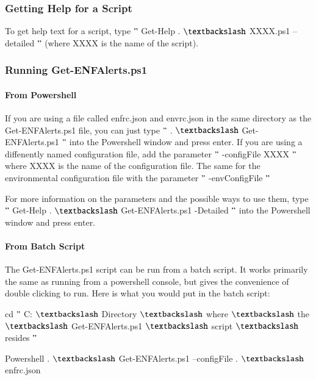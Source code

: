 \documentclass[a4paper,12pt]{report}
\begin{document}
\subsubsection*{Getting Help for a Script}
 \par
To get help text for a script, type  $ " $ Get-Help . $  \textbackslash  $ XXXX.ps1 –detailed $ " $  (where XXXX is the name of the script). \par
\subsubsection*{Running Get-ENFAlerts.ps1}
 \par
\paragraph*{From Powershell}
 \par
If you are using a file called enfrc.json and envrc.json in the same directory as the Get-ENFAlerts.ps1 file, you can just type  $ " $ . $  \textbackslash  $ Get-ENFAlerts.ps1 $ " $  into the Powershell window and press enter. If you are using a diffenently named configuration file, add the parameter  $ " $ -configFile XXXX $ " $  where XXXX is the name of the configuration file. The same for the environmental configuration file with the parameter  $ " $ -envConfigFile $ " $  \par
For more information on the parameters and the possible ways to use them, type  $ " $ Get-Help . $  \textbackslash  $ Get-ENFAlerts.ps1 -Detailed $ " $  into the Powershell window and press enter. \par
\paragraph*{From Batch Script}
 \par
The Get-ENFAlerts.ps1 script can be run from a batch script. It works primarily the same as running from a powershell console, but gives the convenience of double clicking to run. Here is what you would put in the batch script: \par
{\fontsize{9pt}{9pt}\selectfont cd  $ " $ C: $  \textbackslash  $ Directory $  \textbackslash  $ where $  \textbackslash  $ the $  \textbackslash  $ Get-ENFAlerts.ps1 $  \textbackslash  $ script $  \textbackslash  $ resides $ " $ } \par
{\fontsize{9pt}{9pt}\selectfont Powershell . $  \textbackslash  $ Get-ENFAlerts.ps1 –configFile . $  \textbackslash  $ enfrc.json} \par
\end{document}
